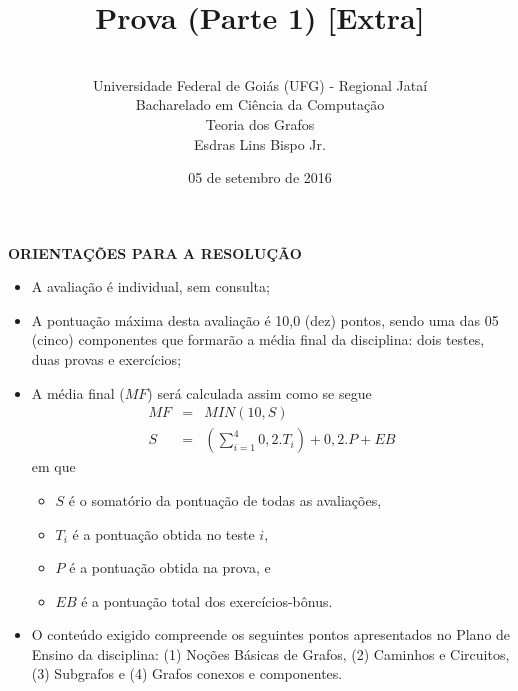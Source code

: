 \documentclass[12pt,a4paper,oneside]{article}
\author{\\Universidade Federal de Goiás (UFG) - Regional Jataí\\Bacharelado em Ciência da Computação \\Teoria dos Grafos \\Esdras Lins Bispo Jr.}
\title{\sc \huge Prova (Parte 1) [Extra]}
\date{05 de setembro de 2016}
\begin{document}
\maketitle

{\bf ORIENTAÇÕES PARA A RESOLUÇÃO}

\footnotesize

\begin{itemize}
	\item A avaliação é individual, sem consulta;
	\item A pontuação máxima desta avaliação é 10,0 (dez) pontos, sendo uma das 05 (cinco) componentes que formarão a média final da disciplina: dois testes, duas provas e exercícios;
	\item A média final ($MF$) será calculada assim como se segue
	\begin{eqnarray}
		MF & = & MIN(10, S) \nonumber \\
		S & = & (\sum_{i=1}^{4} 0,2.T_i ) + 0,2.P  + EB \nonumber
	\end{eqnarray}
	em que 
	\begin{itemize}
		\item $S$ é o somatório da pontuação de todas as avaliações,
		\item $T_i$ é a pontuação obtida no teste $i$,
		\item $P$ é a pontuação obtida na prova, e
		\item $EB$ é a pontuação total dos exercícios-bônus.
	\end{itemize}
	\item O conteúdo exigido compreende os seguintes pontos apresentados no Plano de Ensino da disciplina: (1) Noções Básicas de Grafos, (2) Caminhos e Circuitos, (3) Subgrafos e (4) Grafos conexos e componentes.
\end{itemize}

\begin{center}
\end{center}

\newpage

\normalsize
\end{document}
